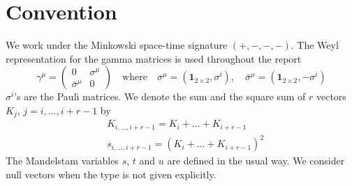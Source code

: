 \section*{Convention}
We work under the Minkowski space-time signature $(+,-,-,-)$.
The Weyl representation for the gamma matrices is used throughout the report
\begin{equation}
\gamma^\mu = \begin{pmatrix}
0 & \sigma^\mu \\
\bar{\sigma}^\mu & 0
\end{pmatrix}
\quad\mathrm{where}\quad
\sigma^\mu = (\mathbf{1}_{2\times 2}, \sigma^i)
,\quad
\bar{\sigma}^\mu = (\mathbf{1}_{2\times 2}, -\sigma^i)
\end{equation}
$\sigma^i$'s are the Pauli matrices.
We denote the sum and the square sum of $r$ vectors $K_j$, $j=i,\ldots, i+r-1$ by
\begin{equation}
\begin{split}
& K_{i,\ldots,i+r-1} = K_i +\ldots + K_{i+r-1}
\\
& s_{i,\ldots , i+r-1} = (K_i+\ldots + K_{i+r-1})^2
\end{split}
\end{equation}
The Mandelstam variables $s$, $t$ and $u$ are defined in the usual way.
We consider null vectors when the type is not given explicitly.









